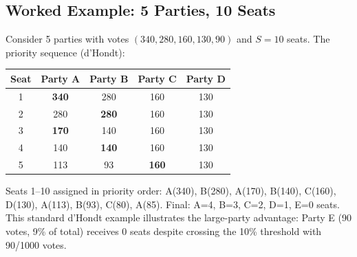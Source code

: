 \subsection{Worked Example: 5 Parties, 10 Seats}

Consider 5 parties with votes $(340, 280, 160, 130, 90)$
and $S = 10$ seats.
The priority sequence (d'Hondt):

\begin{center}
\begin{tabular}{ccccc}
\toprule
Seat & Party A & Party B & Party C & Party D \\
\midrule
1 & \textbf{340} & 280 & 160 & 130 \\
2 & 280 & \textbf{280} & 160 & 130 \\
3 & \textbf{170} & 140 & 160 & 130 \\
4 & 140 & \textbf{140} & 160 & 130 \\
5 & 113 & 93 & \textbf{160} & 130 \\
\bottomrule
\end{tabular}
\end{center}

Seats 1--10 assigned in priority order:
A(340), B(280), A(170), B(140), C(160), D(130), A(113), B(93), C(80), A(85).
Final: A=4, B=3, C=2, D=1, E=0 seats.
This standard d'Hondt example \citep{lijphart1994electoral}
illustrates the large-party advantage: Party E (90 votes, 9\% of total)
receives 0 seats despite crossing the 10\% threshold with 90/1000 votes.
